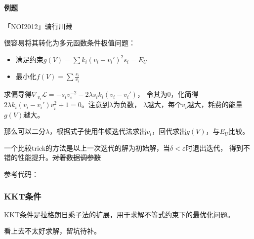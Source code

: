 \paragraph{例题} 「NOI2012」骑行川藏

很容易将其转化为多元函数条件极值问题：
\begin{itemize}
	\item 满足约束$\displaystyle g(V)=\sum{k_i(v_i-v_i')^2s_i}=E_U$
	\item 最小化$\displaystyle f(V)=\sum{\frac{s_i}{v_i}}$
\end{itemize}

求偏导得$\nabla_{v_i} \mathcal{L}=-s_iv_i^{-2}-2\lambda s_ik_i(v_i-v_i')$，
令其为0，化简得$2\lambda k_i(v_i-v_i')v_i^2+1=0$。注意到$\lambda$为负数，
$\lambda$越大，每个$v_i$越大，耗费的能量$g(V)$越大。

那么可以二分$\lambda$，根据式子使用牛顿迭代法求出$v_i$，回代求出$g(V)$，与$E_U$比较。

一个比较trick的方法是以上一次迭代的解为初始解，当$\delta<\varepsilon$时退出迭代，
得到不错的性能提升。\sout{对着数据调参数}

参考代码：


\subsubsection{KKT条件}
KKT条件是拉格朗日乘子法的扩展，用于求解不等式约束下的最优化问题。

看上去不太好求解，留坑待补。
